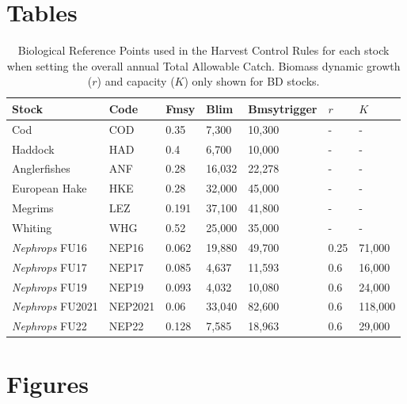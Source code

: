 \documentclass[12pt, halfline, a4paper]{ouparticle}
\begin{document}
\section{Tables}

\begin{table}[!ht]
	\center
	\begin{tabular}{p{3.2cm} p{2cm} p{2cm} p{2cm} p{2cm} p{1cm} p{1cm}}
		\toprule
		Stock & Code & Fmsy & Blim & Bmsytrigger & $r$ & $K$ \\
		\hline
		Cod & COD & 0.35 & 7,300  & 10,300 & - & - \\
		Haddock & HAD & 0.4 & 6,700 & 10,000 & - & -  \\
		Anglerfishes & ANF & 0.28 & 16,032 & 22,278 & - & -  \\
		European Hake & HKE & 0.28 & 32,000 & 45,000 & - & -  \\
		Megrims & LEZ & 0.191 & 37,100 & 41,800 & - & -  \\
		Whiting & WHG & 0.52 & 25,000 & 35,000 & - & -   \\
		\textit{Nephrops} FU16 & NEP16 & 0.062 & 19,880 & 49,700 & 0.25
		& 71,000  \\
		\textit{Nephrops} FU17 & NEP17 & 0.085 & 4,637 & 11,593 & 0.6 &
		16,000 \\
	        \textit{Nephrops} FU19 & NEP19 & 0.093 & 4,032 & 10,080 & 0.6 &
		24,000 \\
		\textit{Nephrops} FU2021 & NEP2021 & 0.06 & 33,040 & 82,600 &
		0.6 & 118,000 \\
		\textit{Nephrops} FU22 & NEP22 & 0.128 & 7,585 & 18,963 & 0.6 &
		29,000 \\
		\bottomrule
	\end{tabular}
	\label{tab:brp}
	\caption{Biological Reference Points used in the Harvest Control Rules
		for each stock when setting the overall annual Total Allowable
		Catch.  Biomass dynamic growth ($r$) and capacity ($K$) only
		shown for BD stocks.}
\end{table}

\clearpage

\section{Figures}
\end{document}
